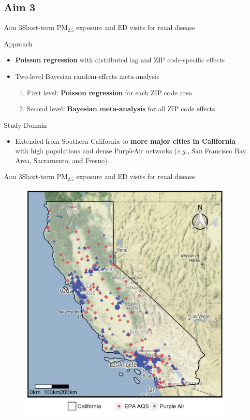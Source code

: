 \documentclass{beamer}
\begin{document}
\subsection{Aim 3}
\begin{frame}{Aim 3}{Short-term PM$_{2.5}$ exposure and ED visits for renal disease}
    \begin{block}{Approach}
        \begin{itemize}
        \setlength{\belowdisplayskip}{-10pt}
            \item \textbf{Poisson regression} with distributed lag and ZIP code-specific effects
            \pause
            \item Two-level Bayesian random-effects meta-analysis
                \begin{enumerate}
                \setlength{\belowdisplayskip}{-10pt}
                    \item First level: \textbf{Poisson regression} for each ZIP code area
                    \setlength{\belowdisplayskip}{-10pt}
                    \item Second level: \textbf{Bayesian meta-analysis} for all ZIP code effects
                \end{enumerate}
        \end{itemize}
    \end{block}
    \pause
    \begin{block}{Study Domain}
        \begin{itemize}
        \item Extended from Southern California to \textbf{more major cities in California} with high populations and dense PurpleAir networks (\textit{e.g.,} San Francisco Bay Area, Sacramento, and Fresno).
        \end{itemize}
    \end{block}
\end{frame}

\begin{frame}{Aim 3}{Short-term PM$_{2.5}$ exposure and ED visits for renal disease}
    \begin{figure}
        \centering
        \includegraphics[height=0.6\textwidth]{img/ca.jpg}
        \label{fig:aim3}
    \end{figure}
\end{frame}
\end{document}
